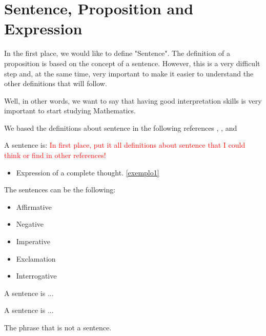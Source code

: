 \section{Sentence, Proposition and Expression}
In the first place, we would like to define "Sentence". The definition of a proposition is based on the concept of a sentence. However, this is a very difficult step and, at the same time, very important to make it easier to understand the other definitions that will follow.

Well, in other words, we want to say that having good interpretation skills is very important to start studying Mathematics.

We based the definitions about sentence in the following references \cite{laszlo}, \cite{shashi}, \cite{wiltold} and \cite{wolfgang}

\begin{definition}[Sentence]
    A sentence is: \textcolor{red}{In first place, put it all definitions about sentence that I could think or find in other references!}

    \begin{itemize}
        \item Expression of a complete thought. \ref{exemplo1}
    \end{itemize}

\end{definition}

The sentences can be the following:

\begin{itemize}
    \item Affirmative
    \item Negative
    \item Imperative
    \item Exclamation
    \item Interrogative
\end{itemize}

\begin{definition}
A sentence is ...


\end{definition}

\begin{definition}
A sentence is ...


\end{definition}

\begin{remark}[Expression]
    The phrase that is not a sentence.
\end{remark}

